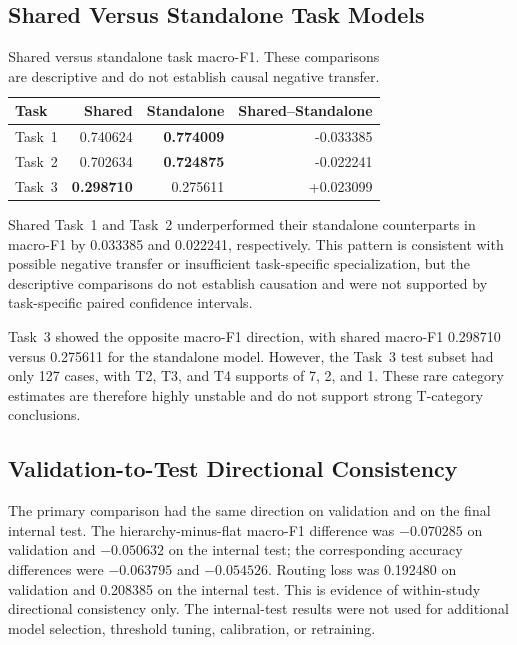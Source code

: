 \subsection{Shared Versus Standalone Task Models}

\begin{table}[t]
    \centering
    \caption{Shared versus standalone task macro-F1. These comparisons are
    descriptive and do not establish causal negative transfer.}
    \label{tab:shared_standalone}
    \footnotesize
    \setlength{\tabcolsep}{3.3pt}
    \begin{tabular}{lrrr}
        \toprule
        Task & Shared & Standalone & Shared--Standalone \\
        \midrule
        Task~1 & 0.740624 & \textbf{0.774009} & -0.033385 \\
        Task~2 & 0.702634 & \textbf{0.724875} & -0.022241 \\
        Task~3 & \textbf{0.298710} & 0.275611 & +0.023099 \\
        \bottomrule
    \end{tabular}
\end{table}

Shared Task~1 and Task~2 underperformed their standalone counterparts in
macro-F1 by 0.033385 and 0.022241, respectively. This pattern is consistent
with possible negative transfer or insufficient task-specific specialization,
but the descriptive comparisons do not establish causation and were not
supported by task-specific paired confidence intervals.

Task~3 showed the opposite macro-F1 direction, with shared macro-F1 0.298710
versus 0.275611 for the standalone model. However, the Task~3 test subset had
only 127 cases, with T2, T3, and T4 supports of 7, 2, and 1. These rare
category estimates are therefore highly unstable and do not support strong
T-category conclusions.

\subsection{Validation-to-Test Directional Consistency}

The primary comparison had the same direction on validation and on the final
internal test. The hierarchy-minus-flat macro-F1 difference was $-0.070285$
on validation and $-0.050632$ on the internal test; the corresponding
accuracy differences were $-0.063795$ and $-0.054526$. Routing loss was
0.192480 on validation and 0.208385 on the internal test. This is evidence of
within-study directional consistency only. The internal-test results were not
used for additional model selection, threshold tuning, calibration, or
retraining.

